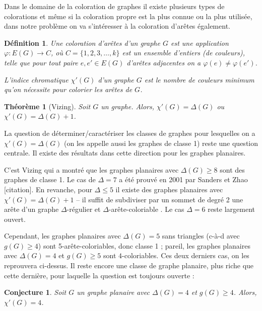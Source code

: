 \documentclass[10pt,a4paper]{article}
\newtheorem{definition}{Définition}
\newtheorem{theorem}{Théorème}
\newtheorem{conjecture}{Conjecture}
\begin{document}
Dans le domaine de la coloration de graphes il existe plusieurs types de colorations et même si la coloration propre est la plus connue ou la plus utilisée, dans notre problème on va s'intéresser à la coloration d'arêtes également.

\begin{definition}%
Une \emph{coloration d'arêtes} d'un graphe $G$ est une application $\varphi: E(G) \to C$, où $C=\{1,2,3,\dots,k\}$ est un ensemble d'entiers (de \emph{couleurs}), telle que pour tout paire $e, e' \in E(G)$ d'arêtes adjacentes on a $\varphi(e) \neq \varphi(e')$.

L'\emph{indice chromatique} $\chi'(G)$ d'un graphe $G$ est le nombre de couleurs minimum qu'on nécessite pour colorier les arêtes de $G$.
\end{definition}

\begin{theorem}[Vizing]
Soit $G$ un graphe. Alors, $\chi'(G) = \Delta(G)$ ou $\chi'(G) = \Delta(G) + 1$.
\end{theorem}

La question de déterminer/caractériser les classes de graphes pour lesquelles on a $\chi'(G) = \Delta(G)$ (on les appelle aussi les graphes de classe 1) reste une question centrale. Il existe des résultats dans cette direction pour les graphes planaires.

C'est Vizing \cite{Vizing} qui a montré que les graphes planaires avec $\Delta(G)\ge 8$ sont des graphes de classe 1. Le cas de $\Delta = 7$ a été prouvé en 2001 par Sanders et Zhao [citation]. 
En revanche, pour $\Delta\le 5$ il existe des graphes planaires avec $\chi'(G)=\Delta(G)+1$ -- il suffit de subdiviser par un sommet de degré 2 une arête d'un graphe $\Delta$-régulier et $\Delta$-arête-coloriable \cite{Vizing2}.
Le cas $\Delta = 6$ reste largement ouvert. 

Cependant, les graphes planaires avec $\Delta(G)=5$ sans triangles (c-à-d avec $g(G)\ge 4$) sont 5-arête-coloriables, donc classe 1 ; pareil, les graphes planaires avec $\Delta(G) = 4$ et $g(G)\ge 5$ sont $4$-coloriables. Ces deux derniers cas, on les reprouvera ci-dessus. Il reste encore une classe de graphe planaire, plus riche que cette dernière, pour laquelle la question est toujours ouverte :

\begin{conjecture}
Soit $G$ un graphe planaire avec $\Delta(G) = 4$ et $g(G) \geq 4$. Alors, $\chi'(G) = 4$. 
\end{conjecture} 
\end{document}
